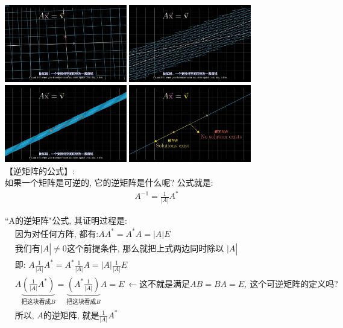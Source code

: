 \documentclass[UTF8]{ctexart}
\begin{document}
\includegraphics[width=0.4\textwidth]{img/0059.png} 
\includegraphics[width=0.4\textwidth]{img/0060.png} \\
\includegraphics[width=0.4\textwidth]{img/0061.png} 
\includegraphics[width=0.4\textwidth]{img/0062.png} \\








【逆矩阵的公式】: \\
如果一个矩阵是可逆的, 它的逆矩阵是什么呢? 公式就是: 
\begin{align*}
	\boxed{
			A^{-1}=\frac{1}{|A|}A^*
	}
\end{align*}


\begin{myEnvSample}
``A的逆矩阵"公式, 其证明过程是: 
\begin{align*}
	&\text{因为对任何方阵,\ 都有:} AA^*=A^*A=|A|E\  \\
&\text{我们有|}A|\ne 0\text{这个前提条件,\ 那么就把}\text{上式两边同时除以\ |}A|\\
&\text{即:\ }A\frac{1}{|A|}A^*=A^*\frac{1}{|A|}A=|A|\frac{1}{|A|}E\\
&A\underset{\text{把这块看成}B}{\underbrace{\left( \frac{1}{|A|}A^* \right) }}=\underset{\text{把这块看成}B}{\underbrace{\left( A^*\frac{1}{|A|} \right) }}A=E\ ←\text{这不就是满足}AB=BA=E,\ \text{这个可逆矩阵的定义吗?}\\
&\text{所以,\ }A\text{的逆矩阵,\ 就是}\frac{1}{|A|}A^*
\end{align*}
\end{myEnvSample}
\end{document}

